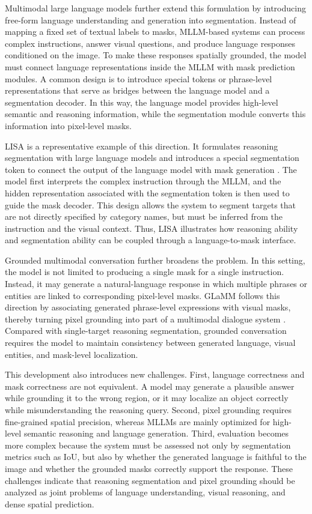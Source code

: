 Multimodal large language models further extend this formulation by introducing free-form language understanding and generation into segmentation. 
Instead of mapping a fixed set of textual labels to masks, MLLM-based systems can process complex instructions, answer visual questions, and produce language responses conditioned on the image. 
To make these responses spatially grounded, the model must connect language representations inside the MLLM with mask prediction modules. 
A common design is to introduce special tokens or phrase-level representations that serve as bridges between the language model and a segmentation decoder. 
In this way, the language model provides high-level semantic and reasoning information, while the segmentation module converts this information into pixel-level masks.

LISA is a representative example of this direction. 
It formulates reasoning segmentation with large language models and introduces a special segmentation token to connect the output of the language model with mask generation \cite{Lai2024}. 
The model first interprets the complex instruction through the MLLM, and the hidden representation associated with the segmentation token is then used to guide the mask decoder. 
This design allows the system to segment targets that are not directly specified by category names, but must be inferred from the instruction and the visual context. 
Thus, LISA illustrates how reasoning ability and segmentation ability can be coupled through a language-to-mask interface.

Grounded multimodal conversation further broadens the problem. 
In this setting, the model is not limited to producing a single mask for a single instruction. 
Instead, it may generate a natural-language response in which multiple phrases or entities are linked to corresponding pixel-level masks. 
GLaMM follows this direction by associating generated phrase-level expressions with visual masks, thereby turning pixel grounding into part of a multimodal dialogue system \cite{Rasheed2024}. 
Compared with single-target reasoning segmentation, grounded conversation requires the model to maintain consistency between generated language, visual entities, and mask-level localization.

This development also introduces new challenges. 
First, language correctness and mask correctness are not equivalent. 
A model may generate a plausible answer while grounding it to the wrong region, or it may localize an object correctly while misunderstanding the reasoning query. 
Second, pixel grounding requires fine-grained spatial precision, whereas MLLMs are mainly optimized for high-level semantic reasoning and language generation. 
Third, evaluation becomes more complex because the system must be assessed not only by segmentation metrics such as IoU, but also by whether the generated language is faithful to the image and whether the grounded masks correctly support the response. 
These challenges indicate that reasoning segmentation and pixel grounding should be analyzed as joint problems of language understanding, visual reasoning, and dense spatial prediction.

